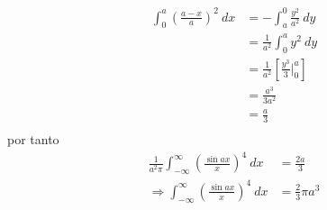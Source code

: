 \documentclass[12pt]{report}
\newcounter{it}
\theoremstyle{largebreak}
\begin{document}
\begin{sol}
\begin{equation*}
            \begin{split}
                \int_{0}^a\left(\frac{a-x}{a}\right)^2\:dx&=-\int_{a}^0\frac{y^2}{a^2}\:dy\\
                &=\frac{1}{a^2}\int_{0}^{a}y^2\:dy\\
                &=\frac{1}{a^2}\left[\frac{y^3}{3}\Big|_{ 0}^{a}\right]\\
                &=\frac{a^3}{3a^2}\\
                &=\frac{a}{3}\\
            \end{split}
        \end{equation*}
        por tanto
        \begin{equation*}
            \begin{split}
                \frac{1}{a^2\pi}\int_{ -\infty}^{\infty}\left(\frac{\sin ax}{x}\right)^4\:dx&=\frac{2a}{3}\\
                \Rightarrow \int_{ -\infty}^{\infty}\left(\frac{\sin ax}{x}\right)^4\:dx&=\frac{2}{3}\pi a^3\\
            \end{split}
        \end{equation*}


\end{sol}
\end{document}
